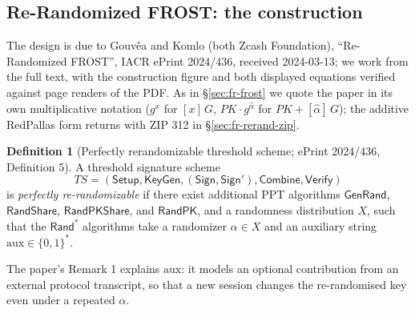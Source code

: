 \documentclass[11pt,a4paper]{article}
\theoremstyle{definition}
\newtheorem{definition}[theorem]{Definition}
\begin{document}
\subsection{Re-Randomized FROST: the construction}
\label{sec:fr-rerand-scheme}

The design is due to Gouv\^ea and Komlo (both Zcash Foundation),
``Re-Randomized FROST'', IACR ePrint 2024/436, received 2024-03-13; we
work from the full text, with the construction figure and both displayed
equations verified against page renders of the PDF. As in
\S\ref{sec:fr-frost} we quote the paper in its own multiplicative
notation ($g^x$ for $[x]\,G$, $PK \cdot g^{\hat{\alpha}}$ for
$PK + [\hat{\alpha}]\,G$); the additive RedPallas form returns with
ZIP 312 in \S\ref{sec:fr-rerand-zip}.

\begin{definition}[Perfectly rerandomizable threshold scheme;
ePrint 2024/436, Definition 5]\label{def:fr-rerandomizable}
A threshold signature scheme
\[
TS = (\mathsf{Setup}, \mathsf{KeyGen}, (\mathsf{Sign}, \mathsf{Sign}'),
\mathsf{Combine}, \mathsf{Verify})
\]
is \emph{perfectly re-randomizable}
if there exist additional PPT algorithms $\mathsf{GenRand}$,
$\mathsf{RandShare}$, $\mathsf{RandPKShare}$, and $\mathsf{RandPK}$,
and a randomness distribution $X$, such that the
$\mathsf{Rand}^*$ algorithms take a randomizer $\alpha \in X$ and an
auxiliary string $\mathrm{aux} \in \{0,1\}^*$.
\end{definition}

The paper's Remark 1 explains $\mathrm{aux}$: it models an optional
contribution from an external protocol transcript, so that a new session
changes the re-randomised key even under a repeated $\alpha$.
\end{document}
